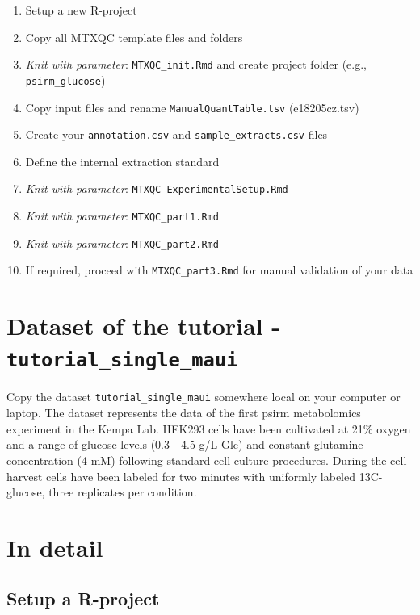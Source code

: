 \documentclass[]{book}
\providecommand{\tightlist}{%
  \setlength{\itemsep}{0pt}\setlength{\parskip}{0pt}}
\theoremstyle{definition}
\theoremstyle{definition}
\theoremstyle{definition}
\theoremstyle{remark}
\begin{document}
\begin{enumerate}
\def\labelenumi{\arabic{enumi}.}
\tightlist
\item
  Setup a new R-project
\item
  Copy all MTXQC template files and folders
\item
  \emph{Knit with parameter}: \texttt{MTXQC\_init.Rmd} and create
  project folder (e.g., \texttt{psirm\_glucose})
\item
  Copy input files and rename \texttt{ManualQuantTable.tsv}
  (e18205cz.tsv)
\item
  Create your \texttt{annotation.csv} and \texttt{sample\_extracts.csv}
  files
\item
  Define the internal extraction standard
\item
  \emph{Knit with parameter}: \texttt{MTXQC\_ExperimentalSetup.Rmd}
\item
  \emph{Knit with parameter}: \texttt{MTXQC\_part1.Rmd}
\item
  \emph{Knit with parameter}: \texttt{MTXQC\_part2.Rmd}
\item
  If required, proceed with \texttt{MTXQC\_part3.Rmd} for manual
  validation of your data
\end{enumerate}

\section{\texorpdfstring{Dataset of the tutorial -
\texttt{tutorial\_single\_maui}}{Dataset of the tutorial - tutorial\_single\_maui}}\label{dataset-of-the-tutorial---tutorial_single_maui}

Copy the dataset \texttt{tutorial\_single\_maui} somewhere local on your
computer or laptop. The dataset represents the data of the first psirm
metabolomics experiment in the Kempa Lab. HEK293 cells have been
cultivated at 21\% oxygen and a range of glucose levels (0.3 - 4.5 g/L
Glc) and constant glutamine concentration (4 mM) following standard cell
culture procedures. During the cell harvest cells have been labeled for
two minutes with uniformly labeled 13C-glucose, three replicates per
condition.

\section{In detail}\label{in-detail}

\subsection{Setup a R-project}\label{setup-a-r-project}
\end{document}
